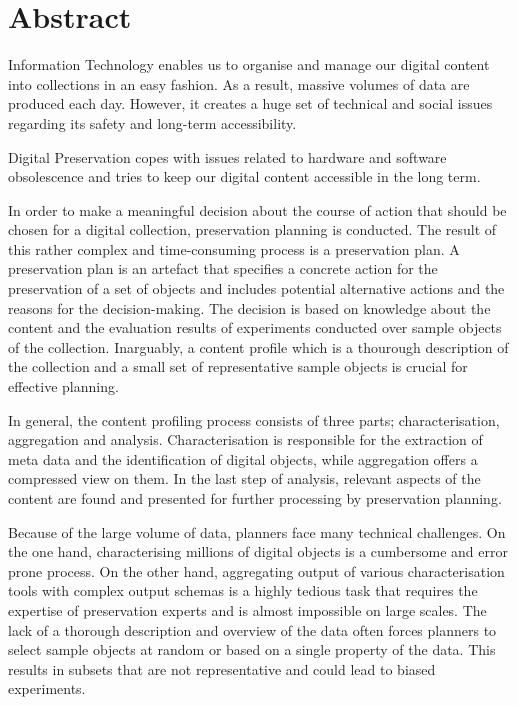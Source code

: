 \chapter*{Abstract}
\vspace{-1cm}
Information Technology enables us to organise and manage our digital content into collections in an easy fashion. As a result, massive volumes of data are produced each day. However, it creates a huge set of technical and social issues regarding its safety and long-term accessibility.

Digital Preservation copes with issues related to hardware and software obsolescence and tries to keep our digital content accessible in the long term.

In order to make a meaningful decision about the course of action that should be chosen for a digital collection, preservation planning is conducted. 
The result of this rather complex and time-consuming process is a preservation plan.
A preservation plan is an artefact that specifies a concrete action for the preservation of a set of objects and includes potential alternative actions and the reasons for the decision-making. The decision is based on knowledge about the content and the evaluation results of experiments conducted over sample objects of the collection.
Inarguably, a content profile which is a thourough description of the collection and a small set of representative sample objects is crucial for effective planning.

In general, the content profiling process consists of three parts; characterisation, aggregation and analysis.
Characterisation is responsible for the extraction of meta data and the identification of digital objects, while aggregation offers a compressed view on them.
In the last step of analysis, relevant aspects of the content are found and presented for further processing by preservation planning.

Because of the large volume of data, planners face many technical challenges. On the one hand, characterising millions of digital objects is a cumbersome and error prone process. On the other hand, aggregating output of various characterisation tools with complex output schemas is a highly tedious task that requires the expertise of preservation experts and is almost impossible on large scales. The lack of a thorough description and overview of the data often forces planners to select sample objects at random or based on a single property of the data. This results in subsets that are not representative and could lead to biased experiments.

